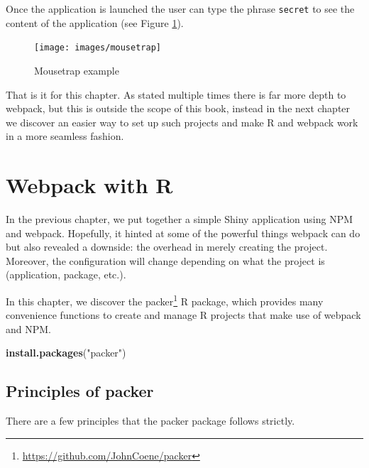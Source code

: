\documentclass[10pt,]{krantz}
\makeatletter
\newenvironment{Shaded}{\begin{snugshade}}{\end{snugshade}}
\newcommand{\KeywordTok}[1]{\textcolor[rgb]{0.27,0.27,0.27}{\textbf{#1}}}
\newcommand{\NormalTok}[1]{#1}
\newcommand{\StringTok}[1]{\textcolor[rgb]{0.5,0.5,0.5}{#1}}
\renewcommand{\href}[2]{#2\footnote{\url{#1}}}
\newenvironment{kframe}{%
\medskip{}
\setlength{\fboxsep}{.8em}
 \def\at@end@of@kframe{}%
 \ifinner\ifhmode%
  \def\at@end@of@kframe{\end{minipage}}%
  \begin{minipage}{\columnwidth}%
 \fi\fi%
 \def\FrameCommand##1{\hskip\@totalleftmargin \hskip-\fboxsep
 \colorbox{shadecolor}{##1}\hskip-\fboxsep
     \hskip-\linewidth \hskip-\@totalleftmargin \hskip\columnwidth}%
 \MakeFramed {\advance\hsize-\width
   \@totalleftmargin\z@ \linewidth\hsize
   \@setminipage}}%
 {\par\unskip\endMakeFramed%
 \at@end@of@kframe}
\renewenvironment{Shaded}{\begin{kframe}}{\end{kframe}}
\makeatother
\begin{document}
Once the application is launched the user can type the phrase \texttt{secret} to see the content of the application (see Figure \ref{fig:mousetrap}).

\begin{figure}[H]

{\centering \texttt{[image: images/mousetrap]} 

}

\caption{Mousetrap example}\label{fig:mousetrap}
\end{figure}

That is it for this chapter. As stated multiple times there is far more depth to webpack, but this is outside the scope of this book, instead in the next chapter we discover an easier way to set up such projects and make R and webpack work in a more seamless fashion.

\hypertarget{packer-overview}{%
\chapter{Webpack with R}\label{packer-overview}}

In the previous chapter, we put together a simple Shiny application using NPM and webpack. Hopefully, it hinted at some of the powerful things webpack can do but also revealed a downside: the overhead in merely creating the project. Moreover, the configuration will change depending on what the project is (application, package, etc.).

In this chapter, we discover the \href{https://github.com/JohnCoene/packer}{packer} \citep{R-packer} R package, which provides many convenience functions to create and manage R projects that make use of webpack and NPM.

\begin{Shaded}
\begin{Highlighting}[]
\KeywordTok{install.packages}\NormalTok{(}\StringTok{"packer"}\NormalTok{)}
\end{Highlighting}
\end{Shaded}

\hypertarget{packer-principles}{%
\section{Principles of packer}\label{packer-principles}}

There are a few principles that the packer package follows strictly.
\end{document}
